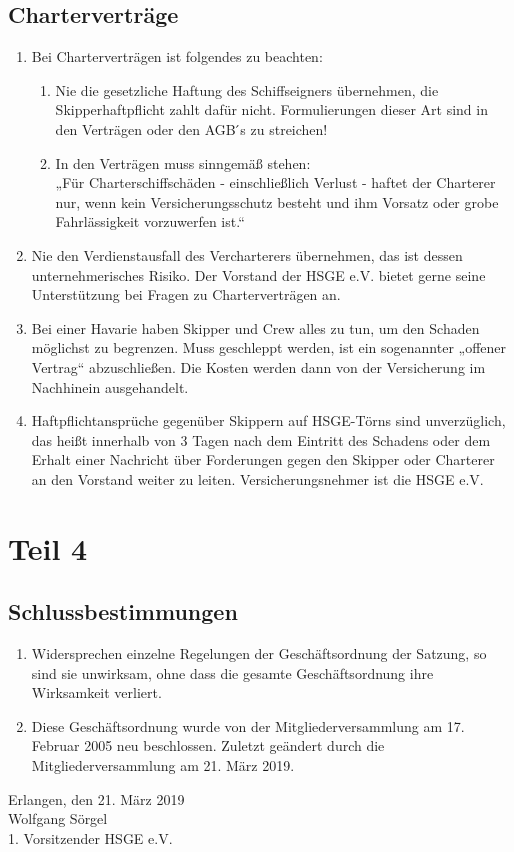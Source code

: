\documentclass[10pt, twocolumn, parskip=half]{scrartcl}
\begin{document}
\subsection{Charterverträge}
\begin{enumerate}[noitemsep]
	\item Bei Charterverträgen ist folgendes zu beachten:
		\begin{enumerate}[noitemsep]
		\item Nie die gesetzliche Haftung des Schiffseigners übernehmen, die Skipperhaftpflicht
			zahlt dafür nicht. Formulierungen dieser Art sind in den Verträgen oder den AGB ́s zu
			streichen!
			\item In den Verträgen muss sinngemäß stehen:\\
				„Für Charterschiffschäden - einschließlich Verlust - haftet der Charterer nur, wenn
			kein Versicherungsschutz besteht und ihm Vorsatz oder grobe Fahrlässigkeit
			vorzuwerfen ist.“
		\end{enumerate}
	\item Nie den Verdienstausfall des Vercharterers übernehmen, das ist dessen unternehmerisches
	Risiko. Der Vorstand der HSGE e.V. bietet gerne seine Unterstützung bei Fragen zu
	Charterverträgen an.
	\item Bei einer Havarie haben Skipper und Crew alles zu tun, um den Schaden möglichst zu
	begrenzen. Muss geschleppt werden, ist ein sogenannter „offener Vertrag“ abzuschließen. Die
	Kosten werden dann von der Versicherung im Nachhinein ausgehandelt.
	\item Haftpflichtansprüche gegenüber Skippern auf HSGE-Törns sind unverzüglich, das heißt
	innerhalb von 3 Tagen nach dem Eintritt des Schadens oder dem Erhalt einer Nachricht über
	Forderungen gegen den Skipper oder Charterer an den Vorstand weiter zu leiten.
	Versicherungsnehmer ist die HSGE e.V.
\end{enumerate}

\section*{Teil 4}
\setcounter{subsection}{0}

\subsection{Schlussbestimmungen}
\begin{enumerate}[noitemsep]
	\item Widersprechen einzelne Regelungen der Geschäftsordnung der Satzung, so sind sie
	unwirksam, ohne dass die gesamte Geschäftsordnung ihre Wirksamkeit verliert.
	\item Diese Geschäftsordnung wurde von der Mitgliederversammlung am 17. Februar 2005 neu
	beschlossen. Zuletzt geändert durch die Mitgliederversammlung am 21. März 2019.
\end{enumerate}
\begin{flushright}
	Erlangen, den 21. März 2019\\
	\vspace{1cm}
	Wolfgang Sörgel\\
	1. Vorsitzender HSGE e.V.\\
\end{flushright}
\end{document}
